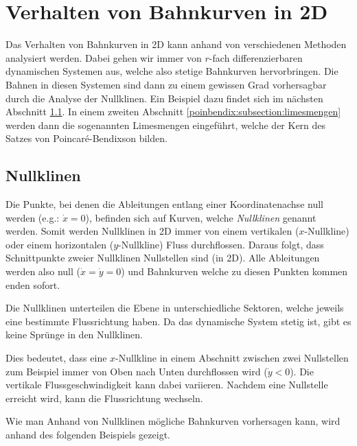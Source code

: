 \section{Verhalten von Bahnkurven in 2D} \label{poinbendix:section:nullklinen}

Das Verhalten von Bahnkurven in 2D kann anhand von verschiedenen Methoden analysiert werden.
Dabei gehen wir immer von $r$-fach differenzierbaren dynamischen Systemen aus, welche also stetige Bahnkurven hervorbringen.
Die Bahnen in diesen Systemen sind dann zu einem gewissen Grad vorhersagbar durch die Analyse der Nullklinen.
Ein Beispiel dazu findet sich im nächsten Abschnitt \ref{poinbendix:subsection:nullklinen}.
In einem zweiten Abschnitt \ref{poinbendix:subsection:limesmengen} werden dann die sogenannten Limesmengen eingeführt, welche der Kern des Satzes von Poincaré-Bendixson bilden.

\subsection{Nullklinen} \label{poinbendix:subsection:nullklinen}

Die Punkte, bei denen die Ableitungen entlang einer Koordinatenachse null werden (e.g.: $\dot{x}=0$), befinden sich auf Kurven, welche \emph{Nullklinen} genannt werden.
Somit werden Nullklinen in 2D immer von einem vertikalen ($x$-Nullkline) oder einem horizontalen ($y$-Nullkline) Fluss durchflossen.
Daraus folgt, dass Schnittpunkte zweier Nullklinen Nullstellen sind (in 2D).
Alle Ableitungen werden also null ($\dot{x}=\dot{y}=0$) und Bahnkurven welche zu diesen Punkten kommen enden sofort.

Die Nullklinen unterteilen die Ebene in unterschiedliche Sektoren, welche jeweils eine bestimmte Flussrichtung haben.
Da das dynamische System stetig ist, gibt es keine Sprünge in den Nullklinen.

Dies bedeutet, dass eine $x$-Nullkline in einem Abschnitt zwischen zwei Nullstellen zum Beispiel immer von Oben nach Unten durchflossen wird ($\dot{y} < 0$).
Die vertikale Flussgeschwindigkeit kann dabei variieren.
Nachdem eine Nullstelle erreicht wird, kann die Flussrichtung wechseln.

Wie man Anhand von Nullklinen mögliche Bahnkurven vorhersagen kann, wird anhand des folgenden Beispiels gezeigt.

